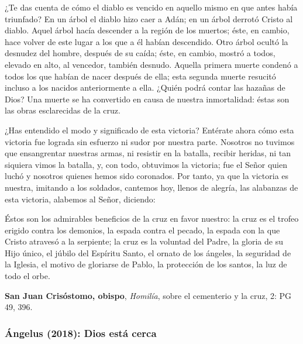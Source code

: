 \begin{patercite}
	¿Te das cuenta de cómo el diablo es vencido en aquello mismo en que antes había triunfado? En un árbol el diablo hizo caer a Adán; en un árbol derrotó Cristo al diablo. Aquel árbol hacía descender a la región de los muertos; éste, en cambio, hace volver de este lugar a los que a él habían descendido. Otro árbol ocultó la desnudez del hombre, después de su caída; éste, en cambio, mostró a todos, elevado en alto, al vencedor, también desnudo. Aquella primera muerte condenó a todos los que habían de nacer después de ella; esta segunda muerte resucitó incluso a los nacidos anteriormente a ella. ¿Quién podrá contar las hazañas de Dios? Una muerte se ha convertido en causa de nuestra inmortalidad: éstas son las obras esclarecidas de la cruz.
	
	¿Has entendido el modo y significado de esta victoria? Entérate ahora cómo esta victoria fue lograda sin esfuerzo ni sudor por nuestra parte. Nosotros no tuvimos que ensangrentar nuestras armas, ni resistir en la batalla, recibir heridas, ni tan siquiera vimos la batalla, y, con todo, obtuvimos la victoria; fue el Señor quien luchó y nosotros quienes hemos sido coronados. Por tanto, ya que la victoria es nuestra, imitando a los soldados, cantemos hoy, llenos de alegría, las alabanzas de esta victoria, alabemos al Señor, diciendo: 
	
	Éstos son los admirables beneficios de la cruz en favor nuestro: la cruz es el trofeo erigido contra los demonios, la espada contra el pecado, la espada con la que Cristo atravesó a la serpiente; la cruz es la voluntad del Padre, la gloria de su Hijo único, el júbilo del Espíritu Santo, el ornato de los ángeles, la seguridad de la Iglesia, el motivo de gloriarse de Pablo, la protección de los santos, la luz de todo el orbe.
	
	\textbf{San Juan Crisóstomo, obispo}, \textit{Homilía}, sobre el cementerio y la cruz, 2: PG 49, 396.
\end{patercite}

\newpage

\subsubsection{Ángelus (2018): Dios está cerca}


